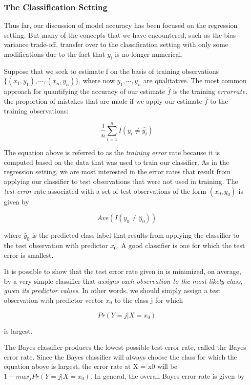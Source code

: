 \documentclass{article}
\theoremstyle{definition}
\theoremstyle{remark}
\begin{document}
	\subsubsection*{The Classification Setting}
	
	Thus far, our discussion of model accuracy has been focused on the regression setting. But many of the concepts that we have encountered, such as the bias-variance trade-off, transfer over to the classification setting with only some modifications due to the fact that $y_i$ is no longer numerical.
	
	Suppose that we seek to estimate f on the basis of training observations $\{(x_1,y_1),\cdots,(x_n, y_n)\}$, where now $y_1,\cdots, y_n$ are qualitative. The most common approach for quantifying the accuracy of our estimate $\hat{f}$ is the training $error rate$, the proportion of mistakes that are made if we apply our estimate $\hat{f}$ to the training observations:
	
	\[
	\frac{1}{n}\sum^n_{i=1}I(y_i\ne\hat{y_i})
	\]
	
	The equation above is referred to as the \textit{training error} rate because it is computed based on the data that was used to train our classifier. As in the regression setting, we are most interested in the error rates that result from applying our classifier to test observations that were not used in training. The \textit{test error} rate associated with a set of test observations of the form $(x_0, y_0)$ is given by
	
	\[
	Ave(I(y_0\ne\hat{y}_0))
	\]
	
	where $\hat{y}_0$ is the predicted class label that results from applying the classifier to the test observation with predictor $x_0$. A good classifier is one for which the test error is smallest.
	
	It is possible to show that the test error rate given in is minimized, on average, by a very simple classifier that \textit{assigns each observation to the most likely class, given its predictor values}. In other words, we should simply assign a test observation with predictor vector $x_0$ to the class j for which
	
	\[
	Pr(Y=j|X=x_0)
	\]
	
	is largest.
	
	The Bayes classifier produces the lowest possible test error rate, called the Bayes error rate. Since the Bayes classifier will always choose the class for which the equation above is largest, the error rate at X = x0 will be $1-max_jPr(Y=j|X=x_0)$. In general, the overall Bayes error rate is given by
	
\end{document}
